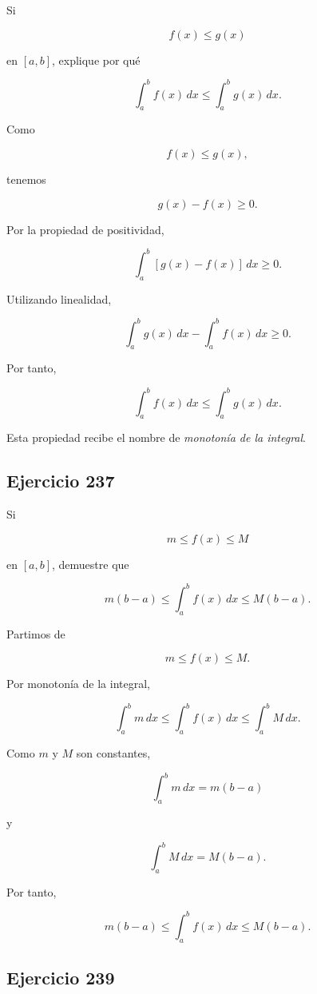 \documentclass[12pt]{article}
\begin{document}
Si

\[
f(x)\leq g(x)
\]

en \([a,b]\), explique por qué

\[
\int_a^bf(x)\,dx
\leq
\int_a^bg(x)\,dx.
\]

Como

\[
f(x)\leq g(x),
\]

tenemos

\[
g(x)-f(x)\geq0.
\]

Por la propiedad de positividad,

\[
\int_a^b[g(x)-f(x)]\,dx\geq0.
\]

Utilizando linealidad,

\[
\int_a^bg(x)\,dx
-
\int_a^bf(x)\,dx
\geq0.
\]

Por tanto,

\[
\boxed{
\int_a^bf(x)\,dx
\leq
\int_a^bg(x)\,dx
}.
\]

Esta propiedad recibe el nombre de \emph{monotonía de la integral}.

\subsection*{Ejercicio 237}

Si

\[
m\leq f(x)\leq M
\]

en \([a,b]\), demuestre que

\[
m(b-a)
\leq
\int_a^bf(x)\,dx
\leq
M(b-a).
\]

Partimos de

\[
m\leq f(x)\leq M.
\]

Por monotonía de la integral,

\[
\int_a^bm\,dx
\leq
\int_a^bf(x)\,dx
\leq
\int_a^bM\,dx.
\]

Como \(m\) y \(M\) son constantes,

\[
\int_a^bm\,dx=m(b-a)
\]

y

\[
\int_a^bM\,dx=M(b-a).
\]

Por tanto,

\[
\boxed{
m(b-a)
\leq
\int_a^bf(x)\,dx
\leq
M(b-a)
}.
\]

\subsection*{Ejercicio 239}
\end{document}
